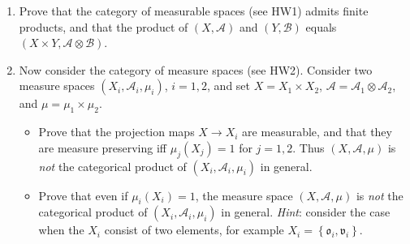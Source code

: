 \begin{enumerate}
\item
  Prove that the category of measurable spaces (see HW1) admits finite products, and that the product of \((X,\mathcal{A})\) and \((Y,\mathcal{B})\) equals \((X \times Y,\mathcal{A} \otimes \mathcal{B})\).
\item
  Now consider the category of measure spaces (see HW2). Consider two measure spaces \((X_{i},\mathcal{A}_{i},\mu_{i})\), \(i = 1,2\), and set \(X = X_{1} \times X_{2}\), \(\mathcal{A} = \mathcal{A}_{1} \otimes \mathcal{A}_{2}\), and \(\mu = \mu_{1} \times \mu_{2}\).

  \begin{itemize}
  \item
    Prove that the projection maps \(X\rightarrow X_{i}\) are measurable, and that they are measure preserving iff \(\mu_{j}(X_{j}) = 1\) for \(j = 1,2\). Thus \((X,\mathcal{A},\mu)\) is \emph{not} the categorical product of \((X_{i},\mathcal{A}_{i},\mu_{i})\) in general.
  \item
    Prove that even if \(\mu_{i}(X_{i}) = 1\), the measure space \((X,\mathcal{A},\mu)\) is \emph{not} the categorical product of \((X_{i},\mathcal{A}_{i},\mu_{i})\) in general. \emph{Hint}: consider the case when the \(X_{i}\) consist of two elements, for example \(X_{i} = \left\{ {\mathfrak{o}_{i},\mathfrak{v}_{i}} \right\}\).
  \end{itemize}
\end{enumerate}
